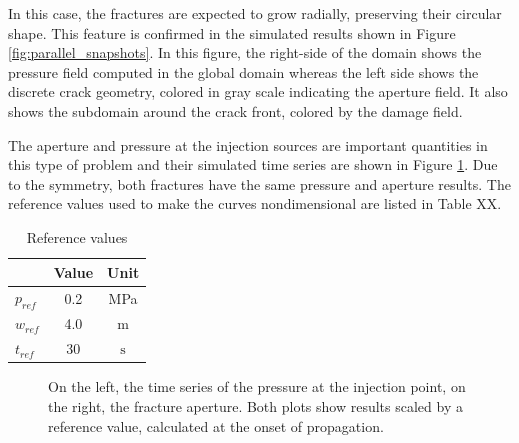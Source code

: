 In this case, the fractures are expected to grow radially, preserving their circular shape. This feature is confirmed in the simulated results shown in Figure \ref{fig:parallel_snapshots}. In this figure, the right-side of the domain shows the pressure field computed in the global domain whereas the left side shows the discrete crack geometry, colored in gray scale indicating the aperture field. It also shows the subdomain around the crack front, colored by the damage field.

The aperture and pressure at the injection sources are important quantities in this type of problem and their simulated time series are shown in Figure \ref{fig:parallel_fracs_charts}. Due to the symmetry, both fractures have the same pressure and aperture results. The reference values used to make the curves nondimensional are listed in Table XX.

\begin{table}[ht]
  \centering
  \caption{Reference values}
  \begin{tabular}[t]{lcc}
  \hline
  &Value &Unit \\
  \hline
  $p_{ref}$&0.2&MPa\\
  $w_{ref}$&4.0&m\\
  $t_{ref}$&30&$\text{s}$\\
  \hline
  \end{tabular}
  \label{geometry properties miehe}
\end{table}%


\begin{figure}[h]
  \noindent
  \hspace{0.5cm}
  
  \caption{On the left, the time series of the pressure at the injection point, on the right, the fracture aperture. Both plots show results scaled by a reference value, calculated at the onset of propagation.}  
  \label{fig:parallel_fracs_charts}
\end{figure}


